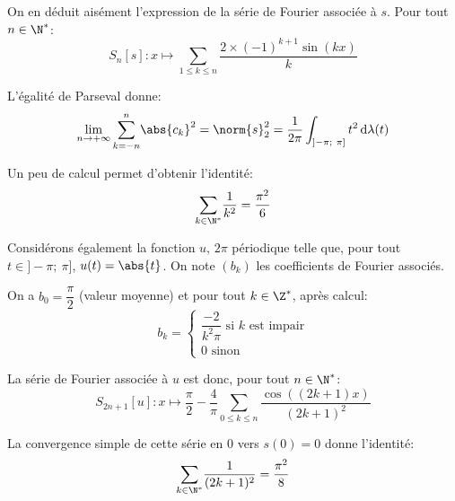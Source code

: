 On en déduit aisément l'expression de la série de Fourier associée à $s$. Pour tout $n \in \N^*$:
\[
S_n[s]: x \mapsto \displaystyle{\sum \limits_{1 \leq k \leq n}} \frac{2 \times (-1)^{k+1} \sin(kx)}{k} 
\] 

L'égalité de Parseval donne:
\[
\lim \limits_{n \to +\infty} \displaystyle{\sum_{k=-n}^n} \abs{c_k}^2 = \norm{s}_2^2 = \dfrac{1}{2\pi} \int_{]-\pi;~\pi]} t^2  \, \mathrm d \lambda(t)
\]

Un peu de calcul permet d'obtenir l'identité:
\[
\displaystyle{\sum \limits_{k \in \N^*}} \frac{1}{k^2} = \dfrac{\pi^2}{6}
\]


Considérons également la fonction $u$, $2\pi$ périodique telle que, pour tout $t \in ]-\pi;~\pi]$, $u(t) = \abs{t}$. On note $(b_k)$ les coefficients de Fourier associés.

On a $b_0 = \dfrac{\pi}{2}$ (valeur moyenne) et pour tout $k \in \Z^*$, après calcul:
\[
b_k = \begin{cases}
 \dfrac{-2}{k^2 \pi} \text{ si $k$ est impair} \\
 0 \text{ sinon}
\end{cases}
\]

La série de Fourier associée à $u$ est donc, pour tout $n \in \N^*$:
\[
S_{2n+1}[u]: x \mapsto \frac{\pi}{2} - \frac{4}{\pi} \displaystyle{\sum \limits_{0 \leq k \leq n}} \frac{\cos\left ((2k+1)x\right )}{(2k+1)^2}
\]

La convergence simple de cette série en $0$ vers $s(0) = 0$ donne l'identité:
\[
\displaystyle{\sum \limits_{k \in \N^*}} \frac{1}{(2k+1)^2} = \dfrac{\pi^2}{8}
\]
